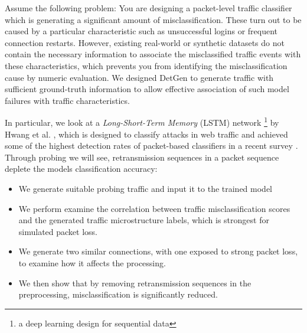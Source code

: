 \documentclass[runningheads]{llncs}
\begin{document}
Assume the following problem: You are designing a packet-level traffic classifier which is generating a significant amount of misclassification. These turn out to be caused by a particular characteristic such as unsuccessful logins or frequent connection restarts. However, existing real-world or synthetic datasets do not contain the necessary information to associate the misclassified traffic events with these characteristics, which prevents you from identifying the misclassification cause by numeric evaluation. We designed DetGen to generate traffic with sufficient ground-truth information to allow effective association of such model failures with traffic characteristics.

In particular, we look at a \textit{Long-Short-Term Memory} (LSTM) network \footnote{a deep learning design for sequential data} by Hwang et al. \cite{hwang2019lstm}, which is designed to classify attacks in web traffic and achieved some of the highest detection rates of packet-based classifiers in a recent survey \cite{tahaei2020rise}. Through probing we will see, retransmission sequences in a packet sequence deplete the models classification accuracy:

\begin{itemize}
\item We generate suitable probing traffic and input it to the trained model
\item We perform examine the correlation between traffic misclassification scores and the generated traffic microstructure labels, which is strongest for simulated packet loss.
\item We generate two similar connections, with one exposed to strong packet loss, to examine how it affects the processing.
\item We then show that by removing retransmission sequences in the preprocessing, misclassification is significantly reduced.
\end{itemize}





\end{document}

